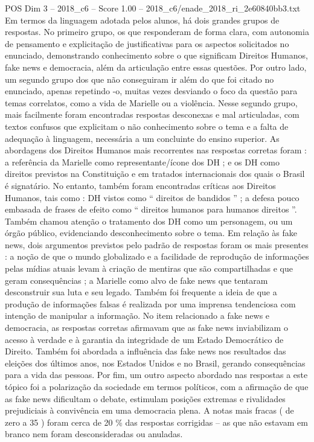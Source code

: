 \begin{textsample}{POS Dim 3 – 2018\_c6 – Score 1.00 – 2018\_c6/enade\_2018\_ri\_2e60840bb3.txt}
Em termos da linguagem adotada pelos alunos, há dois grandes grupos de respostas.
No primeiro grupo, os que responderam de forma clara, com autonomia de pensamento e explicitação de justificativas para os aspectos solicitados no enunciado, demonstrando conhecimento sobre o que significam Direitos Humanos, fake news e democracia, além da articulação entre essas questões.
Por outro lado, um segundo grupo dos que não conseguiram ir além do que foi citado no enunciado, apenas repetindo -o, muitas vezes desviando o foco da questão para temas correlatos, como a vida de Marielle ou a violência.
Nesse segundo grupo, mais facilmente foram encontradas respostas desconexas e mal articuladas, com textos confusos que explicitam o não conhecimento sobre o tema e a falta de adequação à linguagem, necessária a um concluinte do ensino superior.
As abordagens dos Direitos Humanos mais recorrentes nas respostas corretas foram : a referência da Marielle como representante/ícone dos DH ; e os DH como direitos previstos na Constituição e em tratados internacionais dos quais o Brasil é signatário.
No entanto, também foram encontradas críticas aos Direitos Humanos, tais como : DH vistos como “ direitos de bandidos ” ; a defesa pouco embasada de frases de efeito como “ direitos humanos para humanos direitos ”.
Também chamou atenção o tratamento dos DH como um personagem, ou um órgão público, evidenciando desconhecimento sobre o tema.
Em relação às fake news, dois argumentos previstos pelo padrão de respostas foram os mais presentes : a noção de que o mundo globalizado e a facilidade de reprodução de informações pelas mídias atuais levam à criação de mentiras que são compartilhadas e que geram consequências ; a Marielle como alvo de fake news que tentaram desconstruir sua luta e seu legado.
Também foi frequente a ideia de que a produção de informações falsas é realizada por uma imprensa tendenciosa com intenção de manipular a informação.
No item relacionado a fake news e democracia, as respostas corretas afirmavam que as fake news inviabilizam o acesso à verdade e à garantia da integridade de um Estado Democrático de Direito.
Também foi abordada a influência das fake news nos resultados das eleições dos últimos anos, nos Estados Unidos e no Brasil, gerando consequências para a vida das pessoas.
Por fim, um outro aspecto abordado nas respostas a este tópico foi a polarização da sociedade em termos políticos, com a afirmação de que as fake news dificultam o debate, estimulam posições extremas e rivalidades prejudiciais à convivência em uma democracia plena.
A notas mais fracas ( de zero a 35 ) foram cerca de 20 \% das respostas corrigidas – as que não estavam em branco nem foram desconsideradas ou anuladas.

\end{textsample}
